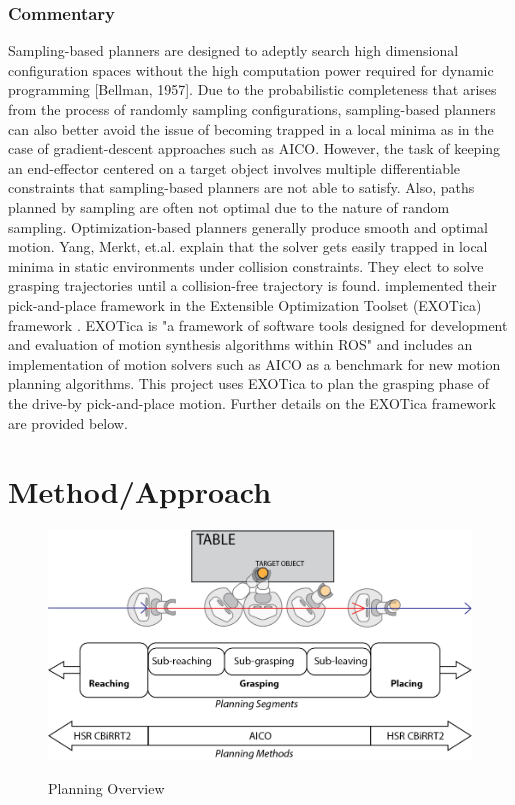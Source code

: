 \documentclass[12pt]{article}
\begin{document}
        \subsubsection{Commentary}
            \par Sampling-based planners are designed to adeptly search high dimensional configuration spaces without the high computation power required for dynamic programming [Bellman, 1957]. Due to the probabilistic completeness that arises from the process of randomly sampling configurations, sampling-based planners can also better avoid the issue of becoming trapped in a local minima as in the case of gradient-descent approaches such as AICO. However, the task of keeping an end-effector centered on a target object involves multiple differentiable constraints that sampling-based planners are not able to satisfy. Also, paths planned by sampling are often not optimal due to the nature of random sampling. Optimization-based planners generally produce smooth and optimal motion.
            Yang, Merkt, et.al. explain that the solver gets easily trapped in local minima in static environments under collision constraints. They elect to solve grasping trajectories until a collision-free trajectory is found. \cite{yang_planning_2018} implemented their pick-and-place framework in the Extensible Optimization Toolset (EXOTica) framework \cite{koubaa_exotica_2019}. EXOTica is "a framework of software tools designed for development and evaluation of motion synthesis algorithms within ROS" and includes an implementation of motion solvers such as AICO as a benchmark for new motion planning algorithms.\cite{koubaa_exotica_2019} This project uses EXOTica to plan the grasping phase of the drive-by pick-and-place motion. Further details on the EXOTica framework are provided below.
    \newpage
    \section{Method/Approach}
        \begin{figure}
            \centering
            \includegraphics[width=0.95\linewidth]{illustrator/segments.png}
            \label{fig:segments}
            \caption{Planning Overview}
        \end{figure}
\end{document}
